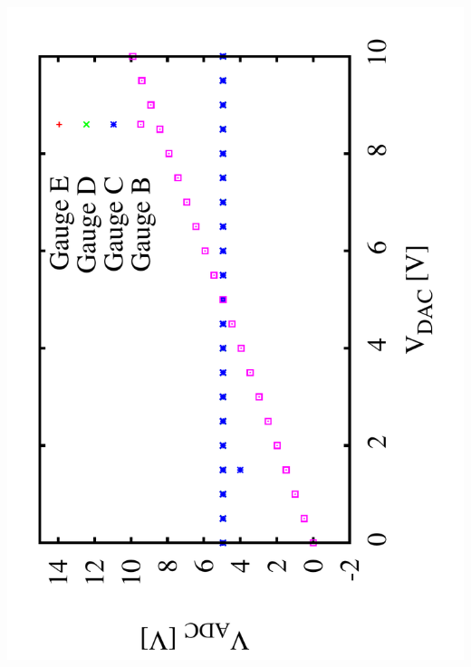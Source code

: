 \documentclass[a4paper,11pt]{book}
\begin{document}
 \hspace*{2cm}\includegraphics[angle=-90,scale=0.15]{image_ai_03.pdf}
\end{document}

